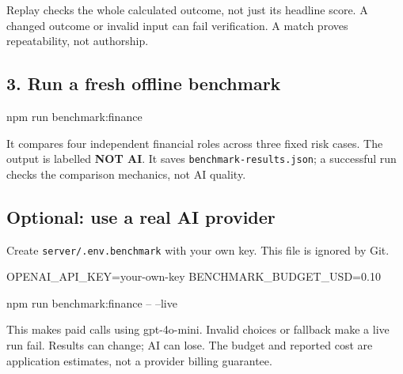 \documentclass[10pt,a4paper]{article}
\begin{document}
Replay checks the whole calculated outcome, not just its headline score. A changed outcome or invalid input can fail verification. A match proves repeatability, not authorship.

\subsection*{3. Run a fresh offline benchmark}
\begin{CodeBlock}
npm run benchmark:finance
\end{CodeBlock}
It compares four independent financial roles across three fixed risk cases. The output is labelled \textbf{NOT AI}. It saves \texttt{benchmark-results.json}; a successful run checks the comparison mechanics, not AI quality.

\subsection*{Optional: use a real AI provider}
Create \texttt{server/.env.benchmark} with your own key. This file is ignored by Git.
\begin{CodeBlock}
OPENAI_API_KEY=your-own-key
BENCHMARK_BUDGET_USD=0.10
\end{CodeBlock}
\begin{CodeBlock}
npm run benchmark:finance -- --live
\end{CodeBlock}
This makes paid calls using gpt-4o-mini. Invalid choices or fallback make a live run fail. Results can change; AI can lose. The budget and reported cost are application estimates, not a provider billing guarantee.


\clearpage
{}
\end{document}
